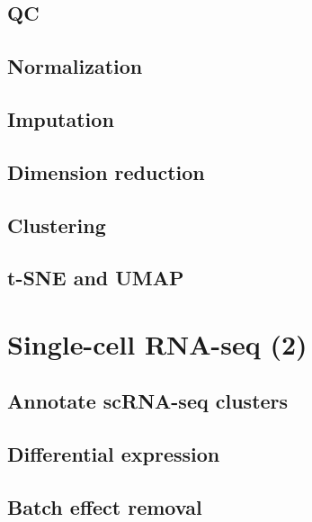 \documentclass[
]{book}
\begin{document}
\hypertarget{qc}{%
\section{QC}\label{qc}}

\hypertarget{normalization}{%
\section{Normalization}\label{normalization}}

\hypertarget{imputation}{%
\section{Imputation}\label{imputation}}

\hypertarget{dimension-reduction}{%
\section{Dimension reduction}\label{dimension-reduction}}

\hypertarget{clustering}{%
\section{Clustering}\label{clustering}}

\hypertarget{t-sne-and-umap}{%
\section{t-SNE and UMAP}\label{t-sne-and-umap}}

\hypertarget{scrna2}{%
\chapter{Single-cell RNA-seq (2)}\label{scrna2}}

\hypertarget{annotate-scrna-seq-clusters}{%
\section{Annotate scRNA-seq clusters}\label{annotate-scrna-seq-clusters}}

\hypertarget{differential-expression}{%
\section{Differential expression}\label{differential-expression}}

\hypertarget{batch-effect-removal-1}{%
\section{Batch effect removal}\label{batch-effect-removal-1}}
\end{document}
